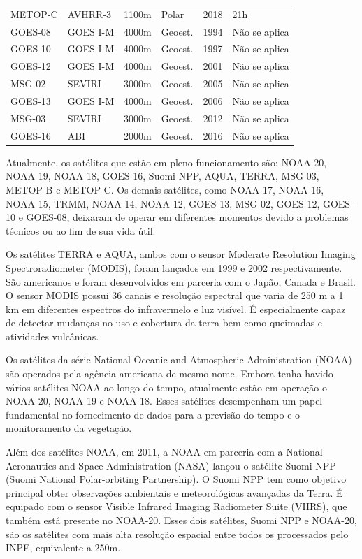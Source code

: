 \documentclass[cic,tc]{iiufrgs}
\begin{document}
\begin{table}[htbp]
\begin{tabular}{ @{}llllcl@{} }
  METOP-C & AVHRR-3  & 1100m       & Polar   & 2018 & 21h \\
  GOES-08 & GOES I-M & 4000m       & Geoest. & 1994 & Não se aplica \\
  GOES-10 & GOES I-M & 4000m       & Geoest. & 1997 & Não se aplica \\
  GOES-12 & GOES I-M & 4000m       & Geoest. & 2001 & Não se aplica \\
  MSG-02  & SEVIRI   & 3000m       & Geoest. & 2005 & Não se aplica \\
  GOES-13 & GOES I-M & 4000m       & Geoest. & 2006 & Não se aplica \\
  MSG-03  & SEVIRI   & 3000m       & Geoest. & 2012 & Não se aplica \\
  GOES-16 & ABI      & 2000m       & Geoest. & 2016 & Não se aplica \\
  \bottomrule
\end{tabular}
\label{table:satelites}
\end{table}

Atualmente, os satélites que estão em pleno funcionamento são: NOAA-20, NOAA-19, NOAA-18, GOES-16, Suomi NPP, AQUA, TERRA, MSG-03, METOP-B e METOP-C. Os demais satélites, como NOAA-17, NOAA-16, NOAA-15, TRMM, NOAA-14, NOAA-12, GOES-13, MSG-02, GOES-12, GOES-10 e GOES-08, deixaram de operar em diferentes momentos devido a problemas técnicos ou ao fim de sua vida útil.

Os satélites TERRA e AQUA, ambos com o sensor Moderate Resolution Imaging Spectroradiometer (MODIS), foram lançados em 1999 e 2002 respectivamente. São americanos e foram desenvolvidos em parceria com o Japão, Canada e Brasil. O sensor MODIS possui 36 canais e resolução espectral que varia de 250 m a 1 km em diferentes espectros do infravermelo e luz visível. É especialmente capaz de detectar mudanças no uso e cobertura da terra bem como queimadas e atividades vulcânicas.

Os satélites da série National Oceanic and Atmospheric Administration (NOAA) são operados pela agência americana de mesmo nome. Embora tenha havido vários satélites NOAA ao longo do tempo, atualmente estão em operação o NOAA-20, NOAA-19 e NOAA-18. Esses satélites desempenham um papel fundamental no fornecimento de dados para a previsão do tempo e o monitoramento da vegetação. 

Além dos satélites NOAA, em 2011, a NOAA em parceria com a National Aeronautics and Space Administration (NASA) lançou o satélite Suomi NPP (Suomi National Polar-orbiting Partnership). O Suomi NPP tem como objetivo principal obter observações ambientais e meteorológicas avançadas da Terra. É equipado com o sensor Visible Infrared Imaging Radiometer Suite (VIIRS), que também está presente no NOAA-20. Esses dois satélites, Suomi NPP e NOAA-20, são os satélites com mais alta resolução espacial entre todos os processados pelo INPE, equivalente a 250m.
\end{document}
